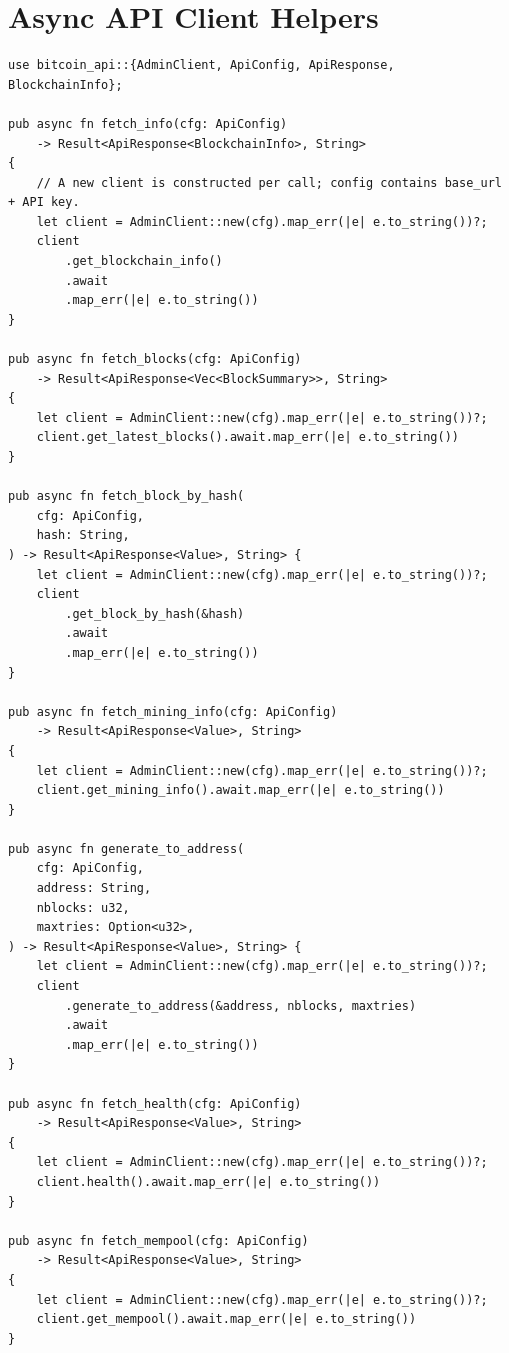 \section{Async API Client Helpers}
\label{sec:ch16-api}

\begin{listing}[H]
\caption{Async API client helpers ()}
\label{lst:ch16-api}
\begin{verbatim}
use bitcoin_api::{AdminClient, ApiConfig, ApiResponse, BlockchainInfo};

pub async fn fetch_info(cfg: ApiConfig)
    -> Result<ApiResponse<BlockchainInfo>, String>
{
    // A new client is constructed per call; config contains base_url + API key.
    let client = AdminClient::new(cfg).map_err(|e| e.to_string())?;
    client
        .get_blockchain_info()
        .await
        .map_err(|e| e.to_string())
}

pub async fn fetch_blocks(cfg: ApiConfig)
    -> Result<ApiResponse<Vec<BlockSummary>>, String>
{
    let client = AdminClient::new(cfg).map_err(|e| e.to_string())?;
    client.get_latest_blocks().await.map_err(|e| e.to_string())
}

pub async fn fetch_block_by_hash(
    cfg: ApiConfig,
    hash: String,
) -> Result<ApiResponse<Value>, String> {
    let client = AdminClient::new(cfg).map_err(|e| e.to_string())?;
    client
        .get_block_by_hash(&hash)
        .await
        .map_err(|e| e.to_string())
}

pub async fn fetch_mining_info(cfg: ApiConfig)
    -> Result<ApiResponse<Value>, String>
{
    let client = AdminClient::new(cfg).map_err(|e| e.to_string())?;
    client.get_mining_info().await.map_err(|e| e.to_string())
}

pub async fn generate_to_address(
    cfg: ApiConfig,
    address: String,
    nblocks: u32,
    maxtries: Option<u32>,
) -> Result<ApiResponse<Value>, String> {
    let client = AdminClient::new(cfg).map_err(|e| e.to_string())?;
    client
        .generate_to_address(&address, nblocks, maxtries)
        .await
        .map_err(|e| e.to_string())
}

pub async fn fetch_health(cfg: ApiConfig)
    -> Result<ApiResponse<Value>, String>
{
    let client = AdminClient::new(cfg).map_err(|e| e.to_string())?;
    client.health().await.map_err(|e| e.to_string())
}

pub async fn fetch_mempool(cfg: ApiConfig)
    -> Result<ApiResponse<Value>, String>
{
    let client = AdminClient::new(cfg).map_err(|e| e.to_string())?;
    client.get_mempool().await.map_err(|e| e.to_string())
}


\end{verbatim}
\end{listing}
